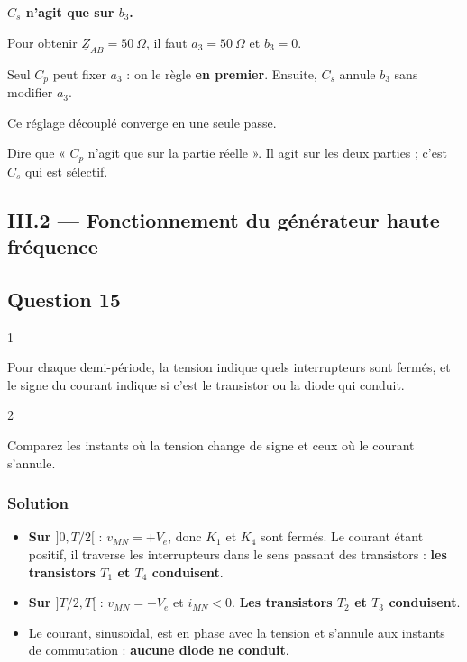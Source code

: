\documentclass[11pt,a4paper]{article}
\providecommand{\tightlist}{\setlength{\itemsep}{0pt}\setlength{\parskip}{0pt}}
\begin{document}
\textbf{\(C_s\) n'agit que sur \(b_3\).}

Pour obtenir \(\underline Z_{AB}=50~\Omega\), il faut \(a_3=50~\Omega\) et \(b_3=0\).

Seul \(C_p\) peut fixer \(a_3\) : on le règle \textbf{en premier}. Ensuite, \(C_s\) annule \(b_3\) sans modifier \(a_3\).

Ce réglage découplé converge en une seule passe.

\begin{piege}

Dire que « \(C_p\) n'agit que sur la partie réelle ». Il agit sur les deux parties ; c'est \(C_s\) qui est sélectif.

\end{piege}

\hypertarget{iii.2-fonctionnement-du-guxe9nuxe9rateur-haute-fruxe9quence}{%
\subsection{III.2 --- Fonctionnement du générateur haute fréquence}\label{iii.2-fonctionnement-du-guxe9nuxe9rateur-haute-fruxe9quence}}

\hypertarget{question-15}{%
\subsection{Question 15}\label{question-15}}

\begin{indication}{1}

Pour chaque demi-période, la tension indique quels interrupteurs sont fermés, et le signe du courant indique si c'est le transistor ou la diode qui conduit.

\end{indication}

\begin{indication}{2}

Comparez les instants où la tension change de signe et ceux où le courant s'annule.

\end{indication}

\hypertarget{solution-14}{%
\subsubsection{Solution}\label{solution-14}}

\begin{itemize}
\tightlist
\item
  \textbf{Sur \(]0,T/2[\)} : \(v_{MN}=+V_e\), donc \(K_1\) et \(K_4\) sont fermés. Le courant étant positif, il traverse les interrupteurs dans le sens passant des transistors : \textbf{les transistors \(T_1\) et \(T_4\) conduisent}.
\item
  \textbf{Sur \(]T/2,T[\)} : \(v_{MN}=-V_e\) et \(i_{MN}<0\). \textbf{Les transistors \(T_2\) et \(T_3\) conduisent}.
\item
  Le courant, sinusoïdal, est en phase avec la tension et s'annule aux instants de commutation : \textbf{aucune diode ne conduit}.
\end{itemize}
\end{document}
